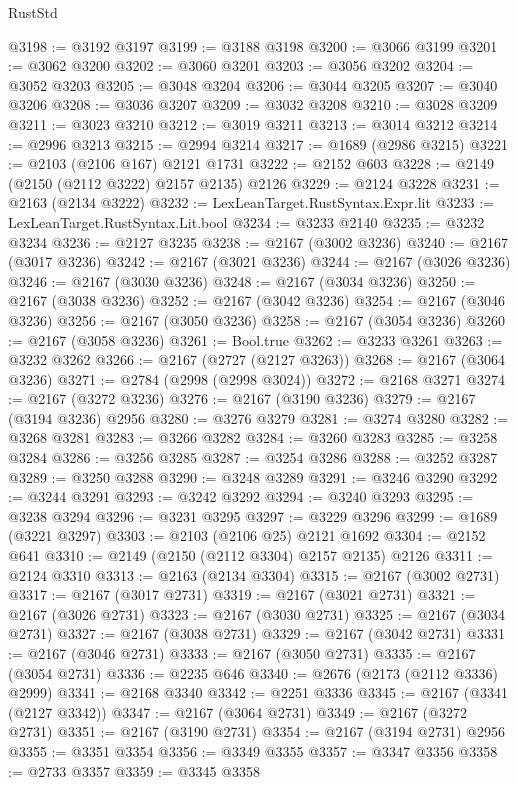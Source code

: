 \begin{lexlean}{RustStd}
\begin{coremodule}
@3198 := @3192 @3197
@3199 := @3188 @3198
@3200 := @3066 @3199
@3201 := @3062 @3200
@3202 := @3060 @3201
@3203 := @3056 @3202
@3204 := @3052 @3203
@3205 := @3048 @3204
@3206 := @3044 @3205
@3207 := @3040 @3206
@3208 := @3036 @3207
@3209 := @3032 @3208
@3210 := @3028 @3209
@3211 := @3023 @3210
@3212 := @3019 @3211
@3213 := @3014 @3212
@3214 := @2996 @3213
@3215 := @2994 @3214
@3217 := @1689 (@2986 @3215)
@3221 := @2103 (@2106 @167) @2121 @1731
@3222 := @2152 @603
@3228 := @2149 (@2150 (@2112 @3222) @2157 @2135) @2126
@3229 := @2124 @3228
@3231 := @2163 (@2134 @3222)
@3232 := LexLeanTarget.RustSyntax.Expr.lit
@3233 := LexLeanTarget.RustSyntax.Lit.bool
@3234 := @3233 @2140
@3235 := @3232 @3234
@3236 := @2127 @3235
@3238 := @2167 (@3002 @3236)
@3240 := @2167 (@3017 @3236)
@3242 := @2167 (@3021 @3236)
@3244 := @2167 (@3026 @3236)
@3246 := @2167 (@3030 @3236)
@3248 := @2167 (@3034 @3236)
@3250 := @2167 (@3038 @3236)
@3252 := @2167 (@3042 @3236)
@3254 := @2167 (@3046 @3236)
@3256 := @2167 (@3050 @3236)
@3258 := @2167 (@3054 @3236)
@3260 := @2167 (@3058 @3236)
@3261 := Bool.true
@3262 := @3233 @3261
@3263 := @3232 @3262
@3266 := @2167 (@2727 (@2127 @3263))
@3268 := @2167 (@3064 @3236)
@3271 := @2784 (@2998 (@2998 @3024))
@3272 := @2168 @3271
@3274 := @2167 (@3272 @3236)
@3276 := @2167 (@3190 @3236)
@3279 := @2167 (@3194 @3236) @2956
@3280 := @3276 @3279
@3281 := @3274 @3280
@3282 := @3268 @3281
@3283 := @3266 @3282
@3284 := @3260 @3283
@3285 := @3258 @3284
@3286 := @3256 @3285
@3287 := @3254 @3286
@3288 := @3252 @3287
@3289 := @3250 @3288
@3290 := @3248 @3289
@3291 := @3246 @3290
@3292 := @3244 @3291
@3293 := @3242 @3292
@3294 := @3240 @3293
@3295 := @3238 @3294
@3296 := @3231 @3295
@3297 := @3229 @3296
@3299 := @1689 (@3221 @3297)
@3303 := @2103 (@2106 @25) @2121 @1692
@3304 := @2152 @641
@3310 := @2149 (@2150 (@2112 @3304) @2157 @2135) @2126
@3311 := @2124 @3310
@3313 := @2163 (@2134 @3304)
@3315 := @2167 (@3002 @2731)
@3317 := @2167 (@3017 @2731)
@3319 := @2167 (@3021 @2731)
@3321 := @2167 (@3026 @2731)
@3323 := @2167 (@3030 @2731)
@3325 := @2167 (@3034 @2731)
@3327 := @2167 (@3038 @2731)
@3329 := @2167 (@3042 @2731)
@3331 := @2167 (@3046 @2731)
@3333 := @2167 (@3050 @2731)
@3335 := @2167 (@3054 @2731)
@3336 := @2235 @646
@3340 := @2676 (@2173 (@2112 @3336) @2999)
@3341 := @2168 @3340
@3342 := @2251 @3336
@3345 := @2167 (@3341 (@2127 @3342))
@3347 := @2167 (@3064 @2731)
@3349 := @2167 (@3272 @2731)
@3351 := @2167 (@3190 @2731)
@3354 := @2167 (@3194 @2731) @2956
@3355 := @3351 @3354
@3356 := @3349 @3355
@3357 := @3347 @3356
@3358 := @2733 @3357
@3359 := @3345 @3358

\end{coremodule}
\end{lexlean}
